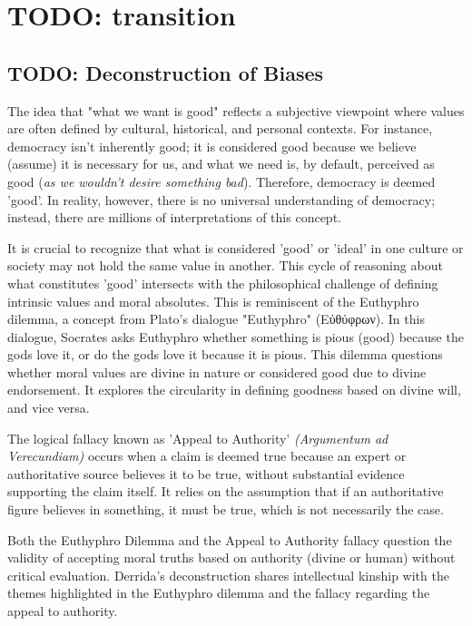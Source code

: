 \documentclass[11pt,a4]{article}
\newcommand{\textgreek}[1]{\begingroup\fontencoding{LGR}\selectfont#1\endgroup}
\begin{document}
    \section{TODO: transition}

    \subsection{TODO: Deconstruction of Biases}
    The idea that "what we want is good" reflects a subjective viewpoint where values are often defined by cultural, historical, and personal contexts. For instance, democracy isn't inherently good; it is considered good because we believe (assume) it is necessary for us, and what we need is, by default, perceived as good (\textit{as we wouldn't desire something bad}). Therefore, democracy is deemed 'good'. In reality, however, there is no universal understanding of democracy; instead, there are millions of interpretations of this concept.
    \par

    It is crucial to recognize that what is considered 'good' or 'ideal' in one culture or society may not hold the same value in another. This cycle of reasoning about what constitutes 'good' intersects with the philosophical challenge of defining intrinsic values and moral absolutes. This is reminiscent of the Euthyphro dilemma, a concept from Plato's dialogue "Euthyphro" \textgreek{(Εὐθύφρων)}. In this dialogue, Socrates asks Euthyphro whether something is pious (good) because the gods love it, or do the gods love it because it is pious. This dilemma questions whether moral values are divine in nature or considered good due to divine endorsement. It explores the circularity in defining goodness based on divine will, and vice versa.

    \par


    The  logical fallacy known as 'Appeal to Authority' \textit{(Argumentum ad Verecundiam)} occurs when a claim is deemed true because an expert or authoritative source believes it to be true, without substantial evidence supporting the claim itself.  It relies on the assumption that if an authoritative figure believes in something, it must be true, which is not necessarily the case.

    \par

    Both the Euthyphro Dilemma and the Appeal to Authority fallacy question the validity of accepting moral truths based on authority (divine or human) without critical evaluation. Derrida's deconstruction\cite{Deconstruction} shares intellectual kinship with the themes highlighted in the Euthyphro dilemma and the fallacy regarding the appeal to authority.
\end{document}
